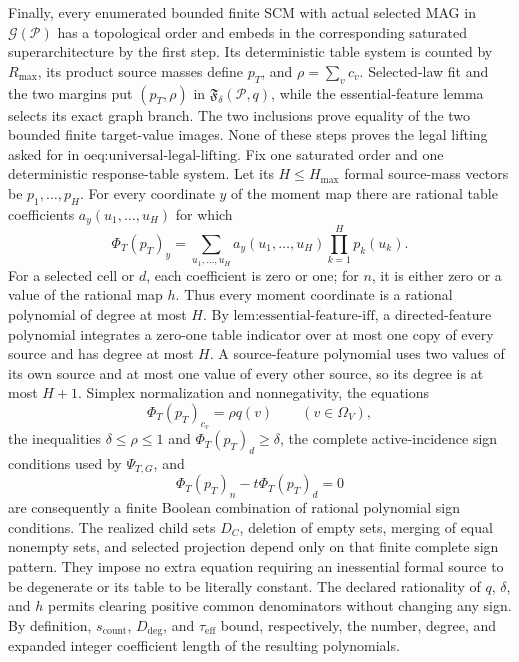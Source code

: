 Finally, every enumerated bounded finite SCM with actual selected MAG in \(\mathcal G(\mathcal P)\) has a topological order and embeds in the corresponding saturated superarchitecture by the first step.  Its deterministic table system is counted by \(R_{\max}\), its product source masses define \(p_T\), and \(\rho=\sum_vc_v\).  Selected-law fit and the two margins put \((p_T,\rho)\) in \(\mathfrak F_\delta(\mathcal P,q)\), while the essential-feature lemma selects its exact graph branch.  The two inclusions prove equality of the two bounded finite target-value images.  None of these steps proves the legal lifting asked for in \(\text{oeq:universal-legal-lifting}\).
Fix one saturated order and one deterministic response-table system.  Let its \(H\leq H_{\max}\) formal source-mass vectors be \(p_1,\ldots,p_H\).  For every coordinate \(y\) of the moment map there are rational table coefficients \(a_y(u_1,\ldots,u_H)\) for which
\[
\Phi_T(p_T)_y
=\sum_{u_1,\ldots,u_H}
  a_y(u_1,\ldots,u_H)\prod_{k=1}^H p_k(u_k).
\]
For a selected cell or \(d\), each coefficient is zero or one; for \(n\), it is either zero or a value of the rational map \(h\).  Thus every moment coordinate is a rational polynomial of degree at most \(H\).  By \(\text{lem:essential-feature-iff}\), a directed-feature polynomial integrates a zero-one table indicator over at most one copy of every source and has degree at most \(H\).  A source-feature polynomial uses two values of its own source and at most one value of every other source, so its degree is at most \(H+1\).  Simplex normalization and nonnegativity, the equations
\[
\Phi_T(p_T)_{c_v}=\rho q(v)\qquad(v\in\Omega_V),
\]
the inequalities \(\delta\leq\rho\leq1\) and \(\Phi_T(p_T)_d\geq\delta\), the complete active-incidence sign conditions used by \(\Psi_{T,G}\), and
\[
\Phi_T(p_T)_n-t\Phi_T(p_T)_d=0
\]
are consequently a finite Boolean combination of rational polynomial sign conditions.  The realized child sets \(D_C\), deletion of empty sets, merging of equal nonempty sets, and selected projection depend only on that finite complete sign pattern.  They impose no extra equation requiring an inessential formal source to be degenerate or its table to be literally constant.  The declared rationality of \(q\), \(\delta\), and \(h\) permits clearing positive common denominators without changing any sign.  By definition, \(s_{\mathrm{count}}\), \(D_{\mathrm{deg}}\), and \(\tau_{\mathrm{eff}}\) bound, respectively, the number, degree, and expanded integer coefficient length of the resulting polynomials.

